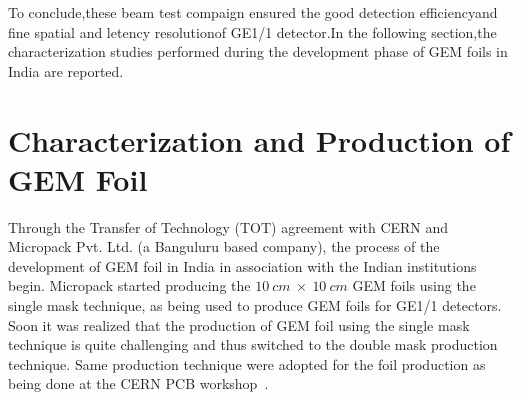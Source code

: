 To conclude,these beam test compaign ensured the good detection efficiencyand fine spatial and letency resolutionof GE1/1 detector.In the following section,the characterization studies performed during the development phase of GEM foils in India are reported. 


\section{Characterization and Production of GEM Foil} %
\label{sec:characterization_and_production_of_gem_foil}
Through the Transfer of Technology (TOT) agreement with CERN and Micropack Pvt. Ltd. (a Banguluru based company), the process of the development of GEM foil in India in association with the Indian institutions begin.
Micropack started producing the $10~cm~\times~10~cm$ GEM foils using the single mask technique, as  being used to produce GEM foils for GE1/1 detectors.
Soon it was realized that the production of GEM foil using the single mask technique is quite challenging and thus switched to the double mask production technique.
Same production technique were adopted for the foil production as being done at the CERN PCB workshop~\cite{DEOLIVEIRA2009}.


